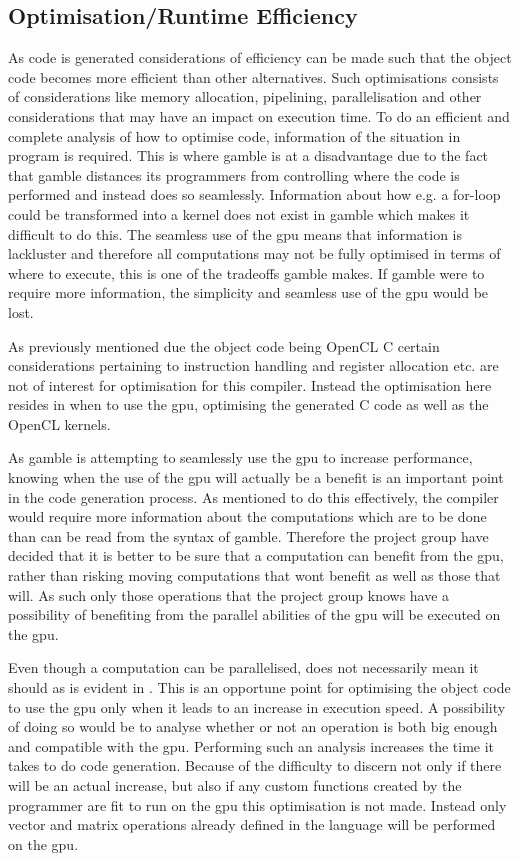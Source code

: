 \subsection*{Optimisation/Runtime Efficiency}
As code is generated considerations of efficiency can be made such that the object code becomes more efficient than other alternatives.
Such optimisations consists of considerations like memory allocation, pipelining, parallelisation and other considerations that may have an impact on execution time.
To do an efficient and complete analysis of how to optimise code, information of the situation in program is required.
This is where \gls{gamble} is at a disadvantage due to the fact that \gls{gamble} distances its programmers from controlling where the code is performed and instead does so seamlessly.
Information about how e.g. a for-loop could be transformed into a kernel does not exist in \gls{gamble} which makes it difficult to do this.
The seamless use of the \acrshort{gpu} means that information is lackluster and therefore all computations may not be fully optimised in terms of where to execute, this is one of the tradeoffs \gls{gamble} makes.
If \gls{gamble} were to require more information, the simplicity and seamless use of the \acrshort{gpu} would be lost.

As previously mentioned due the object code being OpenCL C certain considerations pertaining to instruction handling and register allocation etc. are not of interest for optimisation for this compiler.
Instead the optimisation here resides in when to use the \acrshort{gpu}, optimising the generated C code as well as the OpenCL kernels.

As \gls{gamble} is attempting to seamlessly use the \acrshort{gpu} to increase performance, knowing when the use of the \acrshort{gpu} will actually be a benefit is an important point in the code generation process.
As mentioned to do this effectively, the compiler would require more information about the computations which are to be done than can be read from the syntax of \gls{gamble}.
Therefore the project group have decided that it is better to be sure that a computation can benefit from the \acrshort{gpu}, rather than risking moving computations that wont benefit as well as those that will.
As such only those operations that the project group knows have a possibility of benefiting from the parallel abilities of the \acrshort{gpu} will be executed on the \acrshort{gpu}.

Even though a computation can be parallelised, does not necessarily mean it should as is evident in .
This is an opportune point for optimising the object code to use the \acrshort{gpu} only when it leads to an increase in execution speed.
A possibility of doing so would be to analyse whether or not an operation is both big enough and compatible with the \acrshort{gpu}.
Performing such an analysis increases the time it takes to do code generation.
Because of the difficulty to discern not only if there will be an actual increase, but also if any custom functions created by the programmer are fit to run on the \acrshort{gpu} this optimisation is not made.
Instead only vector and matrix operations already defined in the language will be performed on the \acrshort{gpu}.

